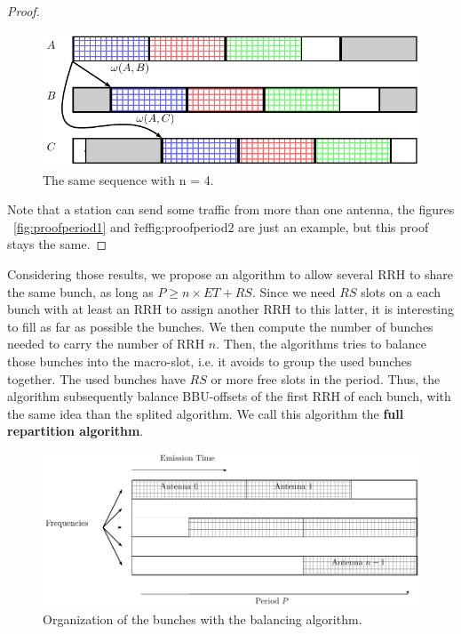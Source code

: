 \documentclass[]{algotel}
\begin{document}
\begin{proof}
   \begin{figure}[h]
\centering
      \includegraphics[scale=0.7]{period2.pdf}
     \caption{The same sequence with n = 4.}   \label{fig:proofperiod2}
  \end{figure}
  Note that a station can send some traffic from more than one antenna, the figures ~\ref{fig:proofperiod1} and \~ref{fig:proofperiod2} are just an example, but this proof stays the same.
 \end{proof}
 
Considering those results, we propose an algorithm to allow several RRH to share the same bunch, as long as $P \ge n\times ET + RS$. 
Since we need $RS$ slots on a each bunch with at least an RRH to assign another RRH to this latter, it is interesting to fill as far as possible the bunches. We then compute the number of bunches needed to carry the number of RRH $n$. Then, the algorithms tries to balance those bunches into the macro-slot, i.e. it avoids to group the used bunches together.
The used bunches have $RS$ or more free slots in the period. Thus, the algorithm subsequently balance BBU-offsets of the first RRH of each bunch, with the same idea than the splited algorithm. We call this algorithm the {\bf full repartition algorithm}. 

   \begin{figure}[h]
\centering
      \includegraphics[scale=0.7]{optimalgo.pdf}
     \caption{Organization of the bunches with the balancing algorithm.}   \label{fig:optimalgo}
  \end{figure}
  
\end{document}
